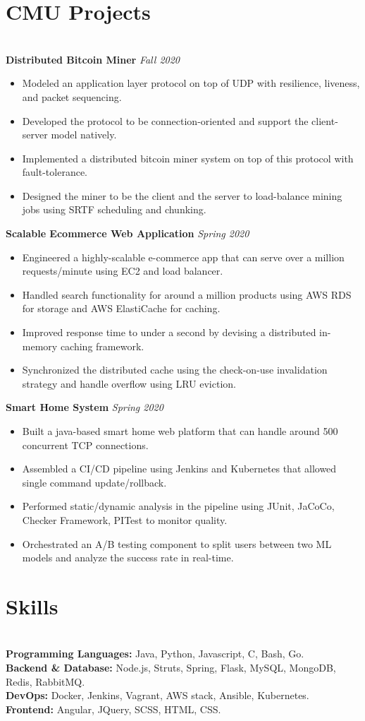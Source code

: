 \documentclass{resume}
\begin{document}
\section*{CMU Projects}
\titlerule
\noindent
\\
\textbf{Distributed Bitcoin Miner} \hfill \textit{Fall 2020}
\begin{itemize}
  \item Modeled an application layer protocol on top of UDP with resilience, liveness, and packet sequencing.
  \item Developed the protocol to be connection-oriented and support the client-server model natively.
  \item Implemented a distributed bitcoin miner system on top of this protocol with fault-tolerance.
  \item Designed the miner to be the client and the server to load-balance mining jobs using SRTF scheduling and chunking.
\end{itemize}
\textbf{Scalable Ecommerce Web Application} \hfill \textit{Spring 2020}
\begin{itemize}
  \item Engineered a highly-scalable e-commerce app that can serve over a million requests/minute using EC2 and load balancer.
  \item Handled search functionality for around a million products using AWS RDS for storage and AWS ElastiCache for caching.
  \item Improved response time to under a second by devising a distributed in-memory caching framework.
  \item Synchronized the distributed cache using the check-on-use invalidation strategy and handle overflow using LRU eviction.
\end{itemize}
\textbf{Smart Home System} \hfill \textit{Spring 2020}
\begin{itemize}
  \item Built a java-based smart home web platform that can handle around 500 concurrent TCP connections.
  \item Assembled a CI/CD pipeline using Jenkins and Kubernetes that allowed single command update/rollback.
  \item Performed static/dynamic analysis in the pipeline using JUnit, JaCoCo, Checker Framework, PITest to monitor quality.
  \item Orchestrated an A/B testing component to split users between two ML models and analyze the success rate in real-time.
\end{itemize}
\section*{Skills}
\titlerule
\noindent
\\
\textbf{Programming Languages:} Java, Python, Javascript, C, Bash, Go. \\
\textbf{Backend \& Database:} Node.js, Struts, Spring, Flask, MySQL, MongoDB, Redis, RabbitMQ. \\
\textbf{DevOps:} Docker, Jenkins, Vagrant, AWS stack, Ansible, Kubernetes. \\
\textbf{Frontend:} Angular, JQuery, SCSS, HTML, CSS.
\end{document}
